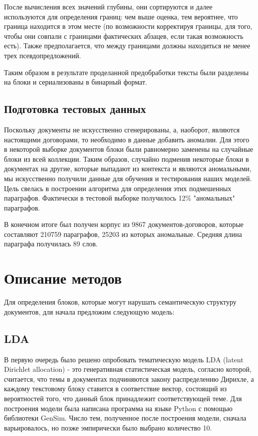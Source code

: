 \documentclass[12pt]{article}
\begin{document}
\begin{enumerate}
{		После вычисления всех значений глубины, они сортируются и далее используются для определения границ: чем выше оценка, тем вероятнее, что граница находится в этом месте (по возможности корректируя границы, для того, чтобы они совпали с границами фактических абзацев, если такая возможность есть). Также предполагается, что между границами должны находиться не менее трех псевдопредложений.
}\end{enumerate}


Таким образом в результате проделанной предобработки тексты были разделены на блоки и сериализованы в бинарный формат.

\subsection{Подготовка тестовых данных}
Поскольку документы не искусственно сгенерированы, а, наоборот, являются настоящими договорами, то необходимо в данные добавить аномалии. Для этого в некоторой выборке документов блоки были равномерно заменены на случайные блоки из всей коллекции. Таким образов, случайно подменив некоторые блоки в документах на другие, которые выпадают из контекста и являются аномальными, мы искусственно получили данные для обучения и тестирования наших моделей. Цель свелась в построении алгоритма для определения этих подмешенных параграфов. Фактически в тестовой выборке получилось  12\% "аномальных" параграфов.

В конечном итоге был получен корпус из 9867 документов-договоров, которые составляют 210759 параграфов, 25203 из которых аномальные. Средняя длина параграфа получилась 89 слов.

\newpage
\section{Описание методов}
Для определения блоков, которые могут нарушать семантическую структуру документов, для начала предложим следующую модель:

\subsection{LDA}
В первую очередь было решено опробовать тематическую модель LDA (latent Dirichlet allocation) - это генеративная статистическая модель, согласно которой, считается, что темы в документах подчиняются закону распределению Дирихле, а каждому текстовому блоку ставится в соответствие вектор, состоящий из вероятностей того, что данный блок принадлежит соответствующей теме. Для построения модели была написана программа на языке Python с помощью библиотеки GenSim. Число тем, полученное после построения модели, сначала варьировалось, но позже эмпирически было выбрано количество 10. 
\end{document}
